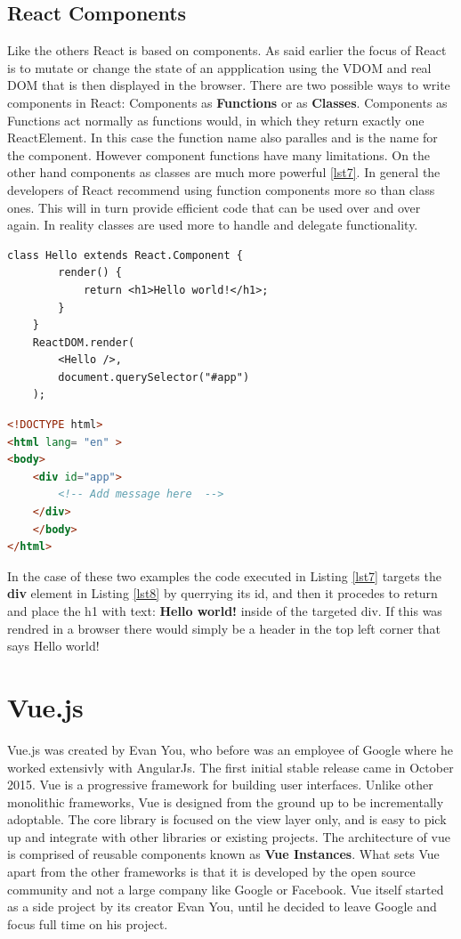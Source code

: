 \documentclass[11pt]{article}
\begin{document}
\subsection{React Components}
Like the others React is based on components. As said earlier the focus of React is to mutate or change the state of an appplication
using the VDOM and real DOM that is then displayed in the browser. There are two possible ways to write components in React: Components as \textbf{Functions} or 
as \textbf{Classes}. Components as Functions act normally as functions would, in which they return exactly one ReactElement. In this case the function name also paralles 
and is the name for the component. However component functions have many limitations. On the other hand components as classes are much more powerful \ref{lst7}. In general the developers of React recommend using function components more so than
class ones. This will in turn provide efficient code that can be used over and over again. In reality classes are used more to handle and delegate functionality.
\begin{lstlisting}[caption={Simple React component}, label={lst7}]
    class Hello extends React.Component {  
        render() {  
            return <h1>Hello world!</h1>;  
        }  
    }
    ReactDOM.render(  
        <Hello />,   
        document.querySelector("#app")
    );
\end{lstlisting}

\begin{lstlisting}[language=HTML, caption={React HTML example}, label={lst8}]
<!DOCTYPE html>
<html lang= "en" >
<body>  
    <div id="app">
        <!-- Add message here  -->
    </div>
    </body>  
</html>
\end{lstlisting}
In the case of these two examples the code executed in Listing \ref{lst7} targets the \textbf{div} element in Listing \ref{lst8} by querrying its id, and 
then it procedes to return and place the h1 with text: \textbf{Hello world!} inside of the targeted div. If this was rendred in a browser there would simply
be a header in the top left corner that says Hello world!

\section{Vue.js}

Vue.js was created by Evan You, who before was an employee of Google where he worked extensivly with AngularJs. The first initial stable release
came in October 2015. Vue is a progressive framework for building user interfaces. Unlike other monolithic frameworks, Vue is 
designed from the ground up to be incrementally adoptable. The core library is focused on the view layer only, and is easy to pick up and integrate with other 
libraries or existing projects\cite{Vuejs0:online}. The architecture of vue is comprised of reusable components known as \textbf{Vue Instances}. What sets Vue apart from the other frameworks is that it is developed by the open source
community and not a large company like Google or Facebook. Vue itself started as a side project by its creator Evan You, until he decided to leave Google and 
focus full time on his project.
\end{document}
